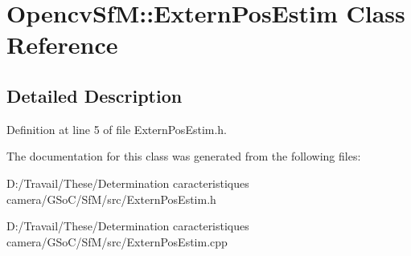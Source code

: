 \hypertarget{class_opencv_sf_m_1_1_extern_pos_estim}{
\section{OpencvSfM::ExternPosEstim Class Reference}
\label{class_opencv_sf_m_1_1_extern_pos_estim}
}


\subsection{Detailed Description}


Definition at line 5 of file ExternPosEstim.h.



The documentation for this class was generated from the following files:\begin{DoxyCompactItemize}
\item 
D:/Travail/These/Determination caracteristiques camera/GSoC/SfM/src/ExternPosEstim.h\item 
D:/Travail/These/Determination caracteristiques camera/GSoC/SfM/src/ExternPosEstim.cpp\end{DoxyCompactItemize}
